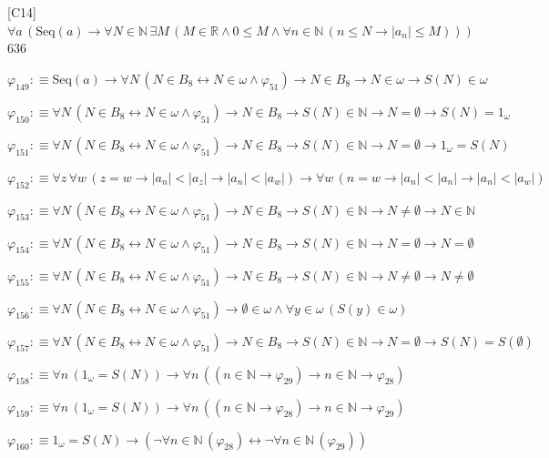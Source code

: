 \begin{fullproof}{[C14]}{$\forall a\,(\mathrm{Seq}(a) \to \forall N \in \mathbb{N}\,\exists M\,(M \in \mathbb{R} \land 0 \leq M \land \forall n \in \mathbb{N}\,(n \leq N \to \lvert a_{n} \rvert \leq M)))$}{636}
\begin{abbrevlist}
\item $\varphi_{149} :\equiv \mathrm{Seq}(a) \to \forall N\,(N \in B_{8} \leftrightarrow N \in \omega \land \varphi_{51}) \to N \in B_{8} \to N \in \omega \to S(N) \in \omega$
\item $\varphi_{150} :\equiv \forall N\,(N \in B_{8} \leftrightarrow N \in \omega \land \varphi_{51}) \to N \in B_{8} \to S(N) \in \mathbb{N} \to N = \emptyset \to S(N) = 1_{\omega}$
\item $\varphi_{151} :\equiv \forall N\,(N \in B_{8} \leftrightarrow N \in \omega \land \varphi_{51}) \to N \in B_{8} \to S(N) \in \mathbb{N} \to N = \emptyset \to 1_{\omega} = S(N)$
\item $\varphi_{152} :\equiv \forall z\,\forall w\,(z = w \to \lvert a_{n} \rvert < \lvert a_{z} \rvert \to \lvert a_{n} \rvert < \lvert a_{w} \rvert) \to \forall w\,(n = w \to \lvert a_{n} \rvert < \lvert a_{n} \rvert \to \lvert a_{n} \rvert < \lvert a_{w} \rvert)$
\item $\varphi_{153} :\equiv \forall N\,(N \in B_{8} \leftrightarrow N \in \omega \land \varphi_{51}) \to N \in B_{8} \to S(N) \in \mathbb{N} \to N \neq \emptyset \to N \in \mathbb{N}$
\item $\varphi_{154} :\equiv \forall N\,(N \in B_{8} \leftrightarrow N \in \omega \land \varphi_{51}) \to N \in B_{8} \to S(N) \in \mathbb{N} \to N = \emptyset \to N = \emptyset$
\item $\varphi_{155} :\equiv \forall N\,(N \in B_{8} \leftrightarrow N \in \omega \land \varphi_{51}) \to N \in B_{8} \to S(N) \in \mathbb{N} \to N \neq \emptyset \to N \neq \emptyset$
\item $\varphi_{156} :\equiv \forall N\,(N \in B_{8} \leftrightarrow N \in \omega \land \varphi_{51}) \to \emptyset \in \omega \land \forall y \in \omega\,(S(y) \in \omega)$
\item $\varphi_{157} :\equiv \forall N\,(N \in B_{8} \leftrightarrow N \in \omega \land \varphi_{51}) \to N \in B_{8} \to S(N) \in \mathbb{N} \to N = \emptyset \to S(N) = S(\emptyset)$
\item $\varphi_{158} :\equiv \forall n\,(1_{\omega} = S(N)) \to \forall n\,((n \in \mathbb{N} \to \varphi_{29}) \to n \in \mathbb{N} \to \varphi_{28})$
\item $\varphi_{159} :\equiv \forall n\,(1_{\omega} = S(N)) \to \forall n\,((n \in \mathbb{N} \to \varphi_{28}) \to n \in \mathbb{N} \to \varphi_{29})$
\item $\varphi_{160} :\equiv 1_{\omega} = S(N) \to (\neg \forall n \in \mathbb{N}\,(\varphi_{28}) \leftrightarrow \neg \forall n \in \mathbb{N}\,(\varphi_{29}))$

\end{abbrevlist}
\end{fullproof}
